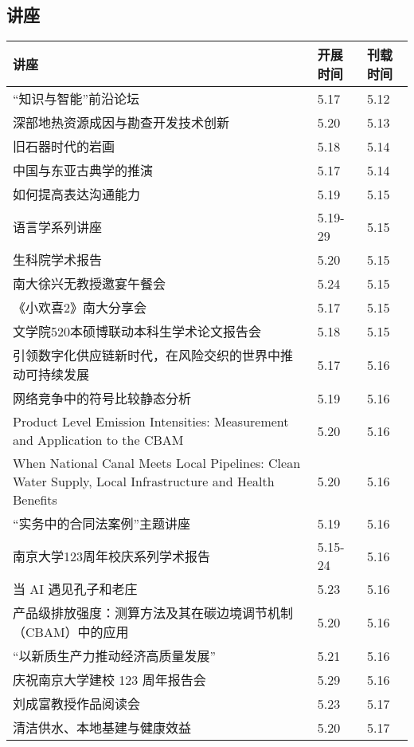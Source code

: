 \documentclass[letterpaper, 12pt]{article}
\begin{document}
\begin{multicols}{2}
\pagebreak

\section{讲座}
\begin{tabular}{|>{\centering\arraybackslash}m{}|m{}|m{}|}
    \hline
    讲座 & 开展时间 & 刊载时间\\
    \hline\hline
    “知识与智能”前沿论坛 & 5.17 & 5.12\\\hline
    深部地热资源成因与勘查开发技术创新 & 5.20 & 5.13\\\hline
    旧石器时代的岩画 & 5.18 & 5.14\\\hline
    中国与东亚古典学的推演 & 5.17 & 5.14\\\hline
    如何提高表达沟通能力 & 5.19 & 5.15\\\hline
    语言学系列讲座 & 5.19-29 & 5.15\\\hline
    生科院学术报告 & 5.20 & 5.15\\\hline
    南大徐兴无教授邀宴午餐会 & 5.24 & 5.15\\\hline
    《小欢喜2》南大分享会 & 5.17 & 5.15\\\hline
    文学院520本硕博联动本科生学术论文报告会 & 5.18 & 5.15\\\hline
    引领数字化供应链新时代，在风险交织的世界中推动可持续发展 & 5.17 & 5.16\\\hline
    网络竞争中的符号比较静态分析 & 5.19 & 5.16\\\hline
    Product  Level Emission Intensities: Measurement and Application to the CBAM & 5.20 & 5.16\\\hline
    When  National Canal Meets Local Pipelines: Clean Water Supply, Local Infrastructure  and Health Benefits & 5.20 & 5.16\\\hline
    “实务中的合同法案例”主题讲座 & 5.19 & 5.16\\\hline
    南京大学123周年校庆系列学术报告 & 5.15-24 & 5.16\\\hline
    当 AI 遇见孔子和老庄 & 5.23 & 5.16\\\hline
    产品级排放强度：测算方法及其在碳边境调节机制（CBAM）中的应用 & 5.20 & 5.16\\\hline
    “以新质生产力推动经济高质量发展” & 5.21 & 5.16\\\hline
     庆祝南京大学建校 123 周年报告会 & 5.29 & 5.16\\\hline
     刘成富教授作品阅读会 & 5.23 & 5.17\\\hline
     清洁供水、本地基建与健康效益 & 5.20 & 5.17\\\hline
    \end{tabular}



\end{multicols}
\end{document}
